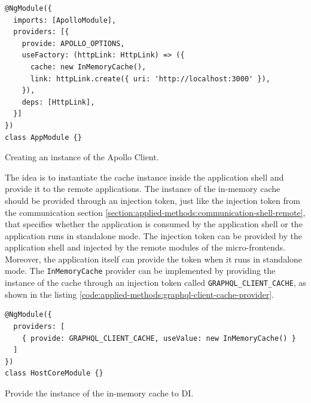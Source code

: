 \ifshowListings
\begin{listing}[H]
\begin{verbatim}
@NgModule({
  imports: [ApolloModule],
  providers: [{
    provide: APOLLO_OPTIONS,
    useFactory: (httpLink: HttpLink) => ({
      cache: new InMemoryCache(),
      link: httpLink.create({ uri: 'http://localhost:3000' }),
    }),
    deps: [HttpLink],
  }]
})
class AppModule {}
\end{verbatim}
\caption{Creating an instance of the Apollo Client.}\label{code:applied-methods:creating-the-apollo-client}
\end{listing}
\fi

\noindent The idea is to instantiate the cache instance inside the application shell and provide it to the remote applications. The instance of the in-memory cache should be provided through an injection token, just like the injection token from the communication section \ref{section:applied-methods:communication-shell-remote}, that specifies whether the application is consumed by the application shell or the application runs in standalone mode. The injection token can be provided by the application shell and injected by the remote modules of the micro-frontends. Moreover, the application itself can provide the token when it runs in standalone mode. The \texttt{InMemoryCache} provider can be implemented by providing the instance of the cache through an injection token called \texttt{GRAPHQL\_CLIENT\_CACHE}, as shown in the listing \ref{code:applied-methods:graphql-client-cache-provider}.

\ifshowListings
\begin{listing}[H]
\begin{verbatim}
@NgModule({
  providers: [
    { provide: GRAPHQL_CLIENT_CACHE, useValue: new InMemoryCache() }
  ]
})
class HostCoreModule {}
\end{verbatim}
\caption{Provide the instance of the in-memory cache to \ac{DI}.}\label{code:applied-methods:graphql-client-cache-provider}
\end{listing}
\fi

